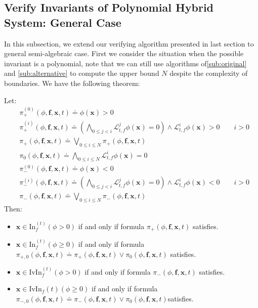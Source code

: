 \documentclass{jssc}
\begin{document}
\subsection{Verify Invariants of Polynomial Hybrid System: General Case}
In this subsection, we extend our verifying algorithm presented in last section to general semi-algebraic case. First we consider the situation when the possible invariant is a polynomial, note that we can still use algorithms of\ref{sub:original} and \ref{sub:alternative} to compute the upper bound $N$ despite the complexity of boundaries. We have the following theorem: 
\begin{theorem}
Let:
	\begin{align*}
		&\pi^{(0)}_+(\phi, \boldsymbol{f}, \boldsymbol{x}, t) \doteq \phi(\boldsymbol{x}) > 0 \\
		&\pi^{(i)}_+(\phi, \boldsymbol{f}, \boldsymbol{x}, t) \doteq (\bigwedge_{0 \leq j < i} \mathcal{L}_{t, f}^j \phi(\boldsymbol{x}) = 0) \wedge \mathcal{L}_{t, f}^i \phi(\boldsymbol{x}) > 0 \qquad i > 0 \\
		&\pi_+(\phi, \boldsymbol{f}, \boldsymbol{x}, t) \doteq \bigvee_{0 \leq i \leq N} \pi_+(\phi, \boldsymbol{f}, \boldsymbol{x}, t) \\
		&\pi_0(\phi, \boldsymbol{f}, \boldsymbol{x}, t) \doteq \bigwedge_{0 \leq i \leq N} \mathcal{L}_{t,f}^i \phi(\boldsymbol{x}) = 0 \\
		&\pi^{(0)}_-(\phi, \boldsymbol{f}, \boldsymbol{x}, t) \doteq \phi(\boldsymbol{x}) < 0 \\
		&\pi^{(i)}_-(\phi, \boldsymbol{f}, \boldsymbol{x}, t) \doteq (\bigwedge_{0 \leq j < i} \mathcal{L}_{t, f}^j \phi(\boldsymbol{x}) = 0) \wedge \mathcal{L}_{t, f}^i \phi(\boldsymbol{x}) < 0 \qquad i > 0 \\
		&\pi_-(\phi, \boldsymbol{f}, \boldsymbol{x}, t) \doteq \bigvee_{0 \leq i \leq N} \pi_-(\phi, \boldsymbol{f}, \boldsymbol{x}, t)
	\end{align*}
Then:
	\begin{itemize}
		\item $\boldsymbol{x} \in \mathrm{In}_f^{(t)}(\phi > 0)$ if and only if formula $\pi_+(\phi, \boldsymbol{f}, \boldsymbol{x}, t)$ satisfies.
		\item $\boldsymbol{x} \in \mathrm{In}_f^{(t)}(\phi \geq 0)$ if and only if formula $\pi_{+,0}(\phi, \boldsymbol{f}, \boldsymbol{x}, t) \doteq \pi_+(\phi, \boldsymbol{f}, \boldsymbol{x}, t) \vee \pi_0(\phi, \boldsymbol{f}, \boldsymbol{x}, t)$ satisfies.
		\item $\boldsymbol{x} \in \mathrm{IvIn}_f^{(t)}(\phi > 0)$ if and only if formula $\pi_-(\phi, \boldsymbol{f}, \boldsymbol{x}, t)$ satisfies.
		\item $\boldsymbol{x} \in \mathrm{IvIn}_f{(t)}(\phi \geq 0)$ if and only if formula $\pi_{-,0}(\phi, \boldsymbol{f}, \boldsymbol{x}, t) \doteq \pi_-(\phi, \boldsymbol{f}, \boldsymbol{x}, t) \vee \pi_0(\phi, \boldsymbol{f}, \boldsymbol{x}, t)$satisfies.
	\end{itemize}
\end{theorem}
\end{document}
